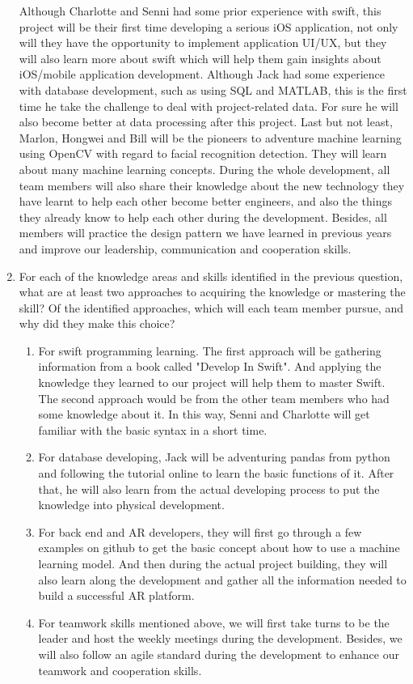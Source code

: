 \documentclass[12pt]{article}
\begin{document}
\begin{enumerate}
  Although Charlotte and Senni had some prior experience with swift, this project will be their first time developing a serious iOS application, not only will they have the opportunity to implement application UI/UX, but they will also learn more about swift which will help them gain insights about iOS/mobile application development. Although Jack had some experience with database development, such as using SQL and MATLAB, this is the first time he take the challenge to deal with project-related data. For sure he will also become better at data processing after this project. Last but not least, Marlon, Hongwei and Bill will be the pioneers to adventure machine learning using OpenCV with regard to facial recognition detection. They will learn about many machine learning concepts. During the whole development, all team members will also share their knowledge about the new technology they have learnt to help each other become better engineers, and also the things they already know to help each other during the development. Besides, all members will practice the design pattern we have learned in previous years and improve our leadership, communication and cooperation skills.
  \item For each of the knowledge areas and skills identified in the previous
  question, what are at least two approaches to acquiring the knowledge or
  mastering the skill?  Of the identified approaches, which will each team
  member pursue, and why did they make this choice?
  \begin{enumerate}
  \item For swift programming learning. The first approach will be gathering information from a book called "Develop In Swift". And applying the knowledge they learned to our project will help them to master Swift. The second approach would be from the other team members who had some knowledge about it. In this way, Senni and Charlotte will get familiar with the basic syntax in a short time. 
  \item For database developing, Jack will be adventuring pandas from python and following the tutorial online to learn the basic functions of it. After that, he will also learn from the actual developing process to put the knowledge into physical development.
  \item For back end and AR developers, they will first go through a few examples on github to get the basic concept about how to use a machine learning model. And then during the actual project building, they will also learn along the development and gather all the information needed to build a successful AR platform. 
  \item For teamwork skills mentioned above, we will first take turns to be the leader and host the weekly meetings during the development. Besides, we will also follow an agile standard during the development to enhance our teamwork and cooperation skills.
  \end{enumerate}
\end{enumerate}
\end{document}
